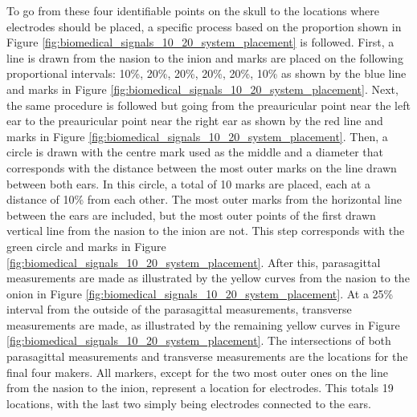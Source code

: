 To go from these four identifiable points on the skull to the locations where electrodes should be placed, a specific process based on the proportion shown in Figure \ref{fig:biomedical_signals_10_20_system_placement} is followed.
First, a line is drawn from the nasion to the inion and marks are placed on the following proportional intervals: 10\%, 20\%, 20\%, 20\%, 20\%, 10\% as shown by the blue line and marks in Figure \ref{fig:biomedical_signals_10_20_system_placement}.
Next, the same procedure is followed but going from the preauricular point near the left ear to the preauricular point near the right ear as shown by the red line and marks in Figure \ref{fig:biomedical_signals_10_20_system_placement}.
Then, a circle is drawn with the centre mark used as the middle and a diameter that corresponds with the distance between the most outer marks on the line drawn between both ears.
In this circle, a total of 10 marks are placed, each at a distance of 10\% from each other.
The most outer marks from the horizontal line between the ears are included, but the most outer points of the first drawn vertical line from the nasion to the inion are not.
This step corresponds with the green circle and marks in Figure \ref{fig:biomedical_signals_10_20_system_placement}.
After this, parasagittal measurements are made as illustrated by the yellow curves from the nasion to the onion in Figure \ref{fig:biomedical_signals_10_20_system_placement}.
At a 25\% interval from the outside of the parasagittal measurements, transverse measurements are made, as illustrated by the remaining yellow curves in Figure \ref{fig:biomedical_signals_10_20_system_placement}.
The intersections of both parasagittal measurements and transverse measurements are the locations for the final four makers.
All markers, except for the two most outer ones on the line from the nasion to the inion, represent a location for electrodes.
This totals 19 locations, with the last two simply being electrodes connected to the ears.


